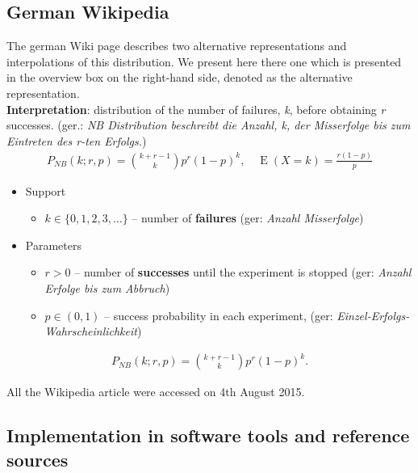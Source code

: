 \subsection*{German Wikipedia}
The german Wiki page describes two alternative representations and interpolations
of this distribution. We present here there one which is presented in the overview 
box on the right-hand side, denoted as the alternative representation.\\
\textbf{Interpretation}: distribution of the number of failures, \emph{k}, before obtaining \emph{r} successes. 
(ger.: \emph{NB Distribution beschreibt die Anzahl, k, der Misserfolge bis zum Eintreten des r-ten Erfolgs.})
\begin{align*}
P_{N\!B}(k;r,p) = {k + r - 1 \choose k} p^r (1-p)^k, \quad \operatorname E(X\!=\!k)=\frac{r(1-p)}{p}
\end{align*}
\begin{itemize}
\item 
Support
\begin{itemize}
\item 
$k \in \{ 0, 1, 2, 3, \dots\}$ -- number of \textbf{failures} (ger: \emph{Anzahl Misserfolge})
\end{itemize}
\item 
Parameters 
\begin{itemize}
\item 
$r > 0$ -- number of \textbf{successes} until the experiment is stopped (ger: \emph{Anzahl Erfolge bis zum Abbruch})
\item 
$p \in (0,1)$ -- success probability in each experiment, (ger: \emph{Einzel-Erfolgs-Wahrscheinlichkeit})
\end{itemize}
\end{itemize}
\begin{align*}
P_{N\!B}(k;r,p) = {k + r - 1 \choose k} p^r (1-p)^k  .
\end{align*}

All the Wikipedia article were accessed on 4th August 2015.

\subsection{Implementation in software tools and reference sources}
\label{subsec:NB1implementations}

